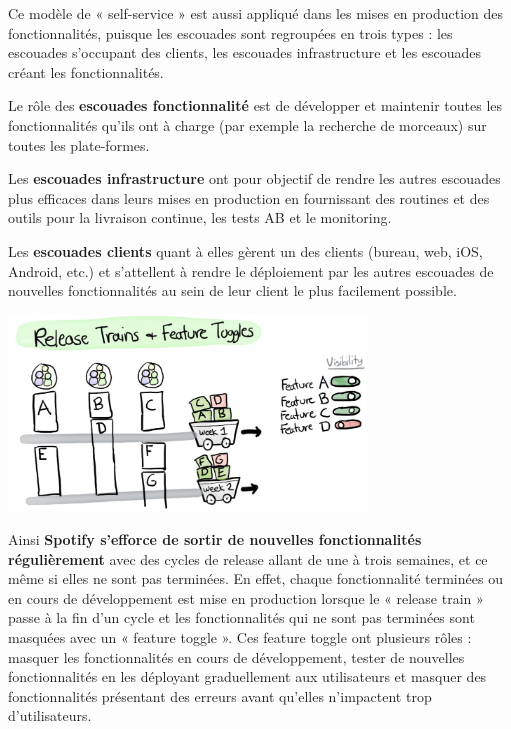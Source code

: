 Ce modèle de « self-service » est aussi appliqué dans les mises en production des fonctionnalités, puisque les escouades sont regroupées en trois types : les escouades s'occupant des clients, les escouades infrastructure et les escouades créant les fonctionnalités.

Le rôle des \textbf{escouades fonctionnalité} est de développer et maintenir toutes les fonctionnalités qu'ils ont à charge (par exemple la recherche de morceaux) sur toutes les plate-formes.

Les \textbf{escouades infrastructure} ont pour objectif de rendre les autres escouades plus efficaces dans leurs mises en production en fournissant des routines et des outils pour la livraison continue, les tests AB et le monitoring.

Les \textbf{escouades clients} quant à elles gèrent un des clients (bureau, web, iOS, Android, etc.) et s'attellent à rendre le déploiement par les autres escouades de nouvelles fonctionnalités au sein de leur client le plus facilement possible.

\newpage

\begin{center}
\includegraphics[width=95mm]{./images_spotify/image08}
\end{center}

Ainsi \textbf{Spotify s'efforce de sortir de nouvelles fonctionnalités régulièrement} avec des cycles de release allant de une à trois semaines, et ce même si elles ne sont pas terminées. En effet, chaque fonctionnalité terminées ou en cours de développement est mise en production lorsque le « release train » passe à la fin d'un cycle et les fonctionnalités qui ne sont pas terminées sont masquées avec un « feature toggle ». Ces feature toggle ont plusieurs rôles : masquer les fonctionnalités en cours de développement, tester de nouvelles fonctionnalités en les déployant graduellement aux utilisateurs et masquer des fonctionnalités présentant des erreurs avant qu'elles n'impactent trop d'utilisateurs.


